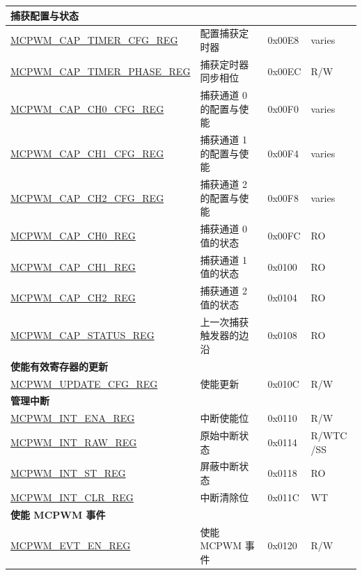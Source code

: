 \begin{longtable}{ | p{6cm} | p{7.2cm} | p{1.2cm} | p{1cm} | }
\multicolumn{3}{|l|}{\textbf{捕获配置与状态}} \\ \hline
\hyperref[regdesc:MCPWMCAPTIMERCFGREG]{MCPWM\_CAP\_TIMER\_CFG\_REG} & 配置捕获定时器 & 0x00E8 & varies \\ \hline
\hyperref[regdesc:MCPWMCAPTIMERPHASEREG]{MCPWM\_CAP\_TIMER\_PHASE\_REG} & 捕获定时器同步相位 & 0x00EC &  R/W \\ \hline
\hyperref[regdesc:MCPWMCAPCH0CFGREG]{MCPWM\_CAP\_CH0\_CFG\_REG} & 捕获通道 0 的配置与使能 & 0x00F0 & varies \\ \hline
\hyperref[regdesc:MCPWMCAPCH1CFGREG]{MCPWM\_CAP\_CH1\_CFG\_REG} & 捕获通道 1 的配置与使能 & 0x00F4 & varies \\ \hline
\hyperref[regdesc:MCPWMCAPCH2CFGREG]{MCPWM\_CAP\_CH2\_CFG\_REG} & 捕获通道 2 的配置与使能 &  0x00F8 & varies\\ \hline
\hyperref[regdesc:MCPWMCAPCH0REG]{MCPWM\_CAP\_CH0\_REG} & 捕获通道 0 值的状态 &0x00FC &  RO \\ \hline
\hyperref[regdesc:MCPWMCAPCH1REG]{MCPWM\_CAP\_CH1\_REG} & 捕获通道 1 值的状态 & 0x0100 & RO \\ \hline
\hyperref[regdesc:MCPWMCAPCH2REG]{MCPWM\_CAP\_CH2\_REG} & 捕获通道 2 值的状态 & 0x0104 & RO \\ \hline
\hyperref[regdesc:MCPWMCAPSTATUSREG]{MCPWM\_CAP\_STATUS\_REG} & 上一次捕获触发器的边沿 & 0x0108 & RO \\ \hline

\multicolumn{3}{|l|}{\textbf{使能有效寄存器的更新}} \\ \hline
\hyperref[regdesc:MCPWMUPDATECFGREG]{MCPWM\_UPDATE\_CFG\_REG} & 使能更新 & 0x010C &  R/W \\ \hline

\multicolumn{3}{|l|}{\textbf{管理中断}} \\ \hline
\hyperref[regdesc:MCPWMINTENAREG]{MCPWM\_INT\_ENA\_REG} & 中断使能位 & 0x0110 & R/W \\ \hline
\hyperref[regdesc:MCPWMINTRAWREG]{MCPWM\_INT\_RAW\_REG} & 原始中断状态 & 0x0114 & R/WTC
/SS\\ \hline
\hyperref[regdesc:MCPWMINTSTREG]{MCPWM\_INT\_ST\_REG} & 屏蔽中断状态 & 0x0118 & RO \\ \hline
\hyperref[regdesc:MCPWMINTCLRREG]{MCPWM\_INT\_CLR\_REG} & 中断清除位 & 0x011C & WT \\ \hline

\multicolumn{4}{|l|}{\textbf{使能 MCPWM 事件}} \\ \hline
\hyperref[regdesc:MCPWMEVTENREG]{MCPWM\_EVT\_EN\_REG} & 使能 MCPWM 事件 & 0x0120 & R/W \\ \hline


\end{longtable}
